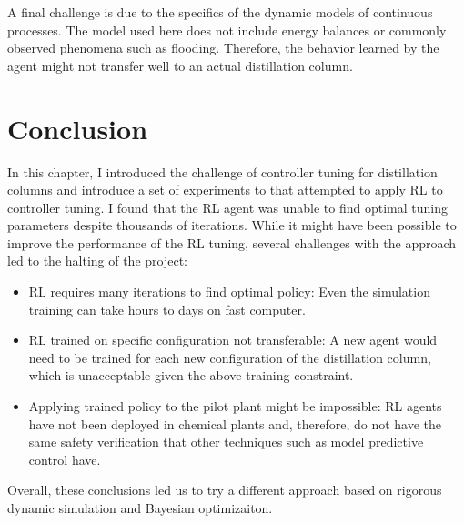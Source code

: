 A final challenge is due to the specifics of the dynamic models of continuous processes. The model used here does not include energy balances or commonly observed phenomena such as flooding.\cite{Nooraii1998} Therefore, the behavior learned by the agent might not transfer well to an actual distillation column.

\section{Conclusion}

In this chapter, I introduced the challenge of controller tuning for distillation columns and introduce a set of experiments to that attempted to apply RL to controller tuning. I found that the RL agent was unable to find optimal tuning parameters despite thousands of iterations. While it might have been  possible to improve the performance of the RL tuning, several challenges with the approach led to the halting of the project:

\begin{itemize}
    \item RL requires many iterations to find optimal policy: Even the simulation training can take hours to days on fast computer.
    \item RL trained on specific configuration not transferable: A new agent would need to be trained for each new configuration of the distillation column, which is unacceptable given the above training constraint.
    \item Applying trained policy to the pilot plant might be impossible: RL agents have not been deployed in chemical plants and, therefore, do not have the same safety verification that other techniques such as model predictive control have. 
\end{itemize}

 Overall, these conclusions led us to try a different approach based on rigorous dynamic simulation and Bayesian optimizaiton.
